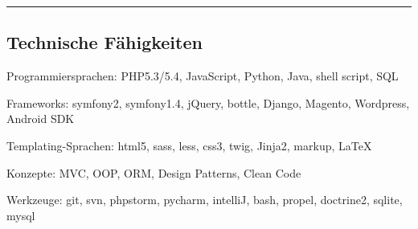 \documentclass[10pt,letterpaper]{article}
\newenvironment{indentsection}[1]%
{\begin{list}{}%
	{\setlength{\leftmargin}{#1}}%
	\item[]%
}
{\end{list}}
\begin{document}
\hrule
\vspace{-0.4em}
\subsection*{Technische Fähigkeiten}

\begin{indentsection}{\parindent}
\begin{description*}
	\item[Programmiersprachen:]
    PHP5.3/5.4, JavaScript, Python, Java, shell script, SQL
	\item[Frameworks:]
	  symfony2, symfony1.4, jQuery, bottle, Django, Magento, Wordpress, Android SDK
	\item[Templating-Sprachen:]
	  html5, sass, less, css3, twig, Jinja2, markup, \LaTeX
	\item[Konzepte:]
	  MVC, OOP, ORM, Design Patterns, Clean Code
  \item[Werkzeuge:]
    git, svn, phpstorm, pycharm, intelliJ, bash, propel, doctrine2, sqlite, mysql
\end{description*}
\end{indentsection}
\end{document}
